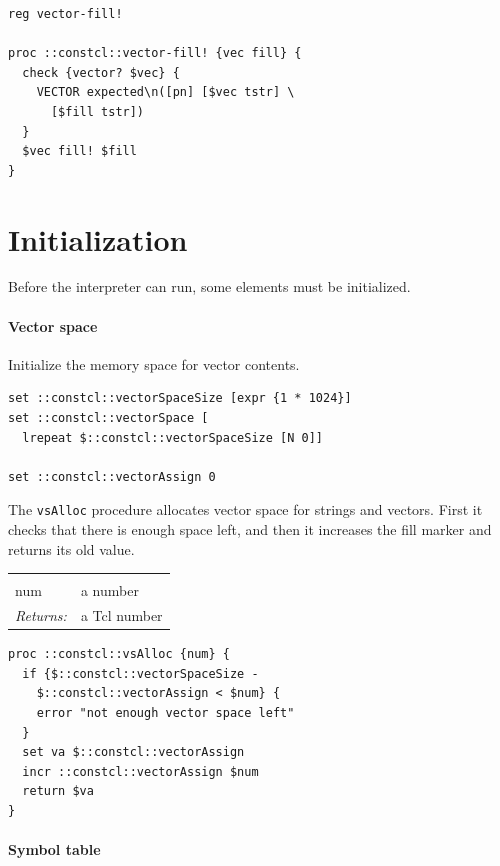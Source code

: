 \documentclass[a5paper,draft]{memoir}
\begin{document}
\begin{lstlisting}
reg vector-fill!

proc ::constcl::vector-fill! {vec fill} {
  check {vector? $vec} {
    VECTOR expected\n([pn] [$vec tstr] \
      [$fill tstr])
  }
  $vec fill! $fill
}
\end{lstlisting}

\chapter{Initialization}
\label{initialization}

Before the interpreter can run, some elements must be initialized.

\subsubsection{Vector space}
\label{vector-space}

Initialize the memory space for vector contents.

\begin{lstlisting}
set ::constcl::vectorSpaceSize [expr {1 * 1024}]
set ::constcl::vectorSpace [
  lrepeat $::constcl::vectorSpaceSize [N 0]]

set ::constcl::vectorAssign 0
\end{lstlisting}

The \texttt{vsAlloc} procedure allocates vector space for strings and vectors. First it checks that there is enough space left, and then it increases the fill marker and returns its old value.

\noindent\begin{tabular}{ |p{1.9cm} p{6.5cm}| }
\hline
\rowcolor[HTML]{CCCCCC} \multicolumn{2}{|l|}{\textbf{vsAlloc (internal)}} \\
num & a number \\
\textit{Returns:} & a Tcl number \\
\hline
\end{tabular}

\begin{lstlisting}
proc ::constcl::vsAlloc {num} {
  if {$::constcl::vectorSpaceSize -
    $::constcl::vectorAssign < $num} {
    error "not enough vector space left"
  }
  set va $::constcl::vectorAssign
  incr ::constcl::vectorAssign $num
  return $va
}
\end{lstlisting}

\subsubsection{Symbol table}
\label{symbol-table}
\end{document}
